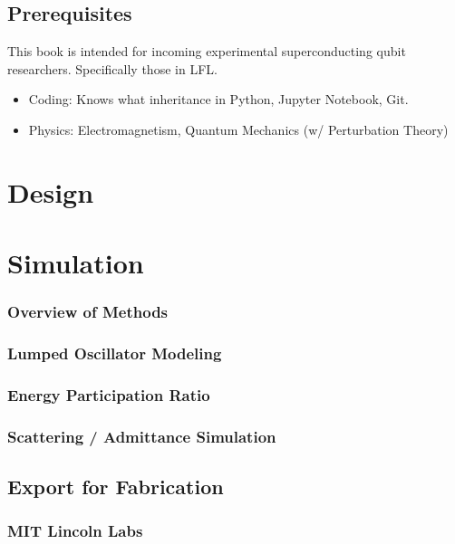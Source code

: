 \documentclass[11pt]{book}
\begin{document}
\section*{Prerequisites}

This book is intended for incoming experimental superconducting qubit researchers. Specifically those in LFL.
\begin{itemize}
	\item Coding: Knows what inheritance in Python, Jupyter Notebook, Git.
	\item Physics: Electromagnetism, Quantum Mechanics (w/ Perturbation Theory)
\end{itemize}

\newpage
\tableofcontents
\newpage

\chapter{Design}







\chapter{Simulation}
\subsection{Overview of Methods}
\subsection{Lumped Oscillator Modeling}
\subsection{Energy Participation Ratio}
\subsection{Scattering / Admittance Simulation}

\section{Export for Fabrication}
\subsection{MIT Lincoln Labs}
\end{document}
